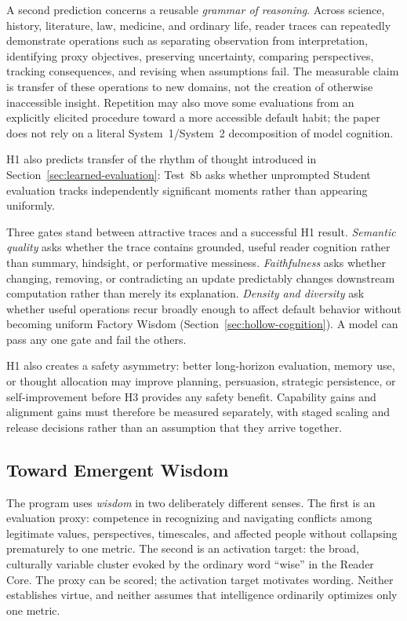 \documentclass[11pt]{article}
\begin{document}
A second prediction concerns a reusable \emph{grammar of reasoning}. Across science, history, literature, law, medicine, and ordinary life, reader traces can repeatedly demonstrate operations such as separating observation from interpretation, identifying proxy objectives, preserving uncertainty, comparing perspectives, tracking consequences, and revising when assumptions fail. The measurable claim is transfer of these operations to new domains, not the creation of otherwise inaccessible insight. Repetition may also move some evaluations from an explicitly elicited procedure toward a more accessible default habit; the paper does not rely on a literal System~1/System~2 decomposition of model cognition.

H1 also predicts transfer of the rhythm of thought introduced in
Section~\ref{sec:learned-evaluation}: Test~8b asks whether unprompted Student
evaluation tracks independently significant moments rather than appearing
uniformly.

Three gates stand between attractive traces and a successful H1 result. \emph{Semantic quality} asks whether the trace contains grounded, useful reader cognition rather than summary, hindsight, or performative messiness. \emph{Faithfulness} asks whether changing, removing, or contradicting an update predictably changes downstream computation rather than merely its explanation. \emph{Density and diversity} ask whether useful operations recur broadly enough to affect default behavior without becoming uniform Factory Wisdom (Section~\ref{sec:hollow-cognition}). A model can pass any one gate and fail the others.

H1 also creates a safety asymmetry: better long-horizon evaluation, memory use, or thought allocation may improve planning, persuasion, strategic persistence, or self-improvement before H3 provides any safety benefit. Capability gains and alignment gains must therefore be measured separately, with staged scaling and release decisions rather than an assumption that they arrive together.

\subsection{Toward Emergent Wisdom}
\label{sec:wisdom_hypothesis}

The program uses \emph{wisdom} in two deliberately different senses. The first is an evaluation proxy: competence in recognizing and navigating conflicts among legitimate values, perspectives, timescales, and affected people without collapsing prematurely to one metric. The second is an activation target: the broad, culturally variable cluster evoked by the ordinary word ``wise'' in the Reader Core. The proxy can be scored; the activation target motivates wording. Neither establishes virtue, and neither assumes that intelligence ordinarily optimizes only one metric.
\end{document}
